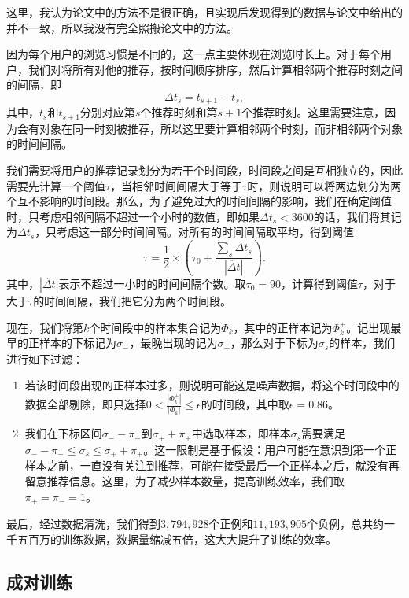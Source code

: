 \documentclass[12pt]{article} %
\begin{document}
\begin{sloppypar}
这里，我认为论文中的方法不是很正确，且实现后发现得到的数据与论文中给出的并不一致，所以我没有完全照搬论文中的方法。

因为每个用户的浏览习惯是不同的，这一点主要体现在浏览时长上。对于每个用户，我们对将所有对他的推荐，按时间顺序排序，然后计算相邻两个推荐时刻之间的间隔，即
\begin{equation}
	\Delta t_s = t_{s+1} - t_s,
\end{equation}
其中，$t_s$和$t_{s+1}$分别对应第$s$个推荐时刻和第$s+1$个推荐时刻。这里需要注意，因为会有对象在同一时刻被推荐，所以这里要计算相邻两个时刻，而非相邻两个对象的时间间隔。

我们需要将用户的推荐记录划分为若干个时间段，时间段之间是互相独立的，因此需要先计算一个阈值$\tau$，当相邻时间间隔大于等于$\tau$时，则说明可以将两边划分为两个互不影响的时间段。那么，为了避免过大的时间间隔的影响，我们在确定阈值时，只考虑相邻间隔不超过一个小时的数值，即如果$\Delta t_s<3600$的话，我们将其记为$\ddot{\Delta t_s}$，只考虑这一部分时间间隔。对所有的时间间隔取平均，得到阈值
\begin{equation}
\tau = \frac{1}{2} \times (\tau_0 + \frac{\sum_{s}\ddot{\Delta t_s}}{|\ddot{\Delta t}|}).
\end{equation}
其中，$|\ddot{\Delta t}|$表示不超过一小时的时间间隔个数。取$\tau_0=90$，计算得到阈值$\tau$，对于大于$\tau$的时间间隔，我们把它分为两个时间段。

现在，我们将第$k$个时间段中的样本集合记为$\Phi_k$，其中的正样本记为$\Phi^+_k$。记出现最早的正样本的下标记为$\sigma_-$，最晚出现的记为$\sigma_+$，那么对于下标为$\sigma_s$的样本，我们进行如下过滤：
\begin{enumerate}
	\item 若该时间段出现的正样本过多，则说明可能这是噪声数据，将这个时间段中的数据全部剔除，即只选择$0< \frac{|\Phi^+_k|}{|\Phi_k|} \le \epsilon$的时间段，其中取$\epsilon=0.86$。
	\item 我们在下标区间$\sigma_--\pi_-$到$\sigma_++\pi_+$中选取样本，即样本$\sigma_s$需要满足$\sigma_--\pi_-\le\sigma_s\le\sigma_++\pi_+$。这一限制是基于假设：用户可能在意识到第一个正样本之前，一直没有关注到推荐，可能在接受最后一个正样本之后，就没有再留意推荐信息。这里，为了减少样本数量，提高训练效率，我们取$\pi_+=\pi_-=1$。
\end{enumerate}

最后，经过数据清洗，我们得到$3,794,928$个正例和$11,193,905$个负例，总共约一千五百万的训练数据，数据量缩减五倍，这大大提升了训练的效率。

\subsection{成对训练}
\label{sec:pair}


\end{sloppypar}
\end{document}

